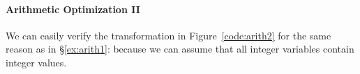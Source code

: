 

\paragraph{Arithmetic Optimization II}

We can easily verify the transformation in Figure~\ref{code:arith2}
for the same reason as in \S\ref{ex:arith1}: because we can assume
that all integer variables contain integer values.


